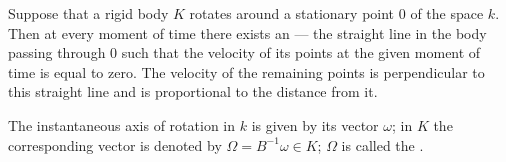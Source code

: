 Suppose that a rigid body $K$ rotates around a stationary point $0$ of the space $k$. Then at every moment of time there exists an  — the straight line in the body passing through $0$ such that the velocity of its points at the given moment of time is equal to zero. The velocity of the remaining points is perpendicular to this straight line and is proportional to the distance from it.

The instantaneous axis of rotation in $k$ is given by its vector $\omega$; in $K$ the corresponding vector is denoted by $\Omega = B^{-1}\omega \in K$; $\Omega$ is called the .
